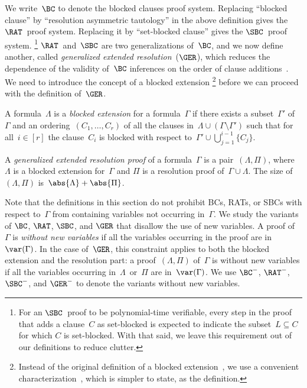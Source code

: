 \documentclass[10pt,a4paper]{article}
\begin{document}
We write~$\BC$ to denote the blocked clauses proof system.
Replacing ``blocked clause'' by ``resolution asymmetric tautology''
in the above definition gives the $\RAT$~proof system.
Replacing it by ``set-blocked clause'' gives the $\SBC$~proof system.%
\footnote{For an $\SBC$~proof to be polynomial-time verifiable,
  every step in the proof that adds a clause~$C$ as set-blocked
  is expected to indicate the subset~$L \subseteq C$ for which $C$ is set-blocked.
  With that said, we leave this requirement out of our definitions to reduce clutter.}
$\RAT$~and~$\SBC$ are two generalizations of~$\BC$, and we now define another,
called \emph{generalized extended resolution}~($\GER$),
which reduces the dependence of the validity of~$\BC$ inferences
on the order of clause additions~\cite[see][Section~1.3]{Kul99b}.
We need to introduce the concept of a blocked extension%
\footnote{Instead of the original definition
  of a blocked extension~\cite[Definition~6.3]{Kul99b},
  we use a convenient characterization~\cite[Lemma~6.5]{Kul99b},
  which is simpler to state, as the definition.}
before we can proceed with the definition of~$\GER$.

\begin{definition}\label{def:blocked-extension}
  A formula~$\Lambda$ is a \emph{blocked extension} for a formula~$\Gamma$
  if there exists a subset~$\Gamma'$ of~$\Gamma$
  and an ordering~$(C_1, \dots, C_r)$
  of all the clauses in~$\Lambda \cup (\Gamma \setminus \Gamma')$
  such that for all~$i \in [r]$ the clause~$C_i$ is blocked
  with respect to~$\Gamma' \cup \bigcup_{j = 1}^{i - 1} \{C_j\}$.
\end{definition}

\begin{definition}
  A \emph{generalized extended resolution proof} of a formula~$\Gamma$
  is a pair~$(\Lambda, \Pi)$,
  where $\Lambda$ is a blocked extension for~$\Gamma$
  and $\Pi$ is a resolution proof of~$\Gamma \cup \Lambda$.
  The size of~$(\Lambda, \Pi)$ is~$\abs{\Lambda} + \abs{\Pi}$.
\end{definition}

Note that the definitions in this section do not prohibit
BCs, RATs, or SBCs with respect to~$\Gamma$
from containing variables not occurring in~$\Gamma$.
We study the variants of $\BC$, $\RAT$, $\SBC$, and $\GER$
that disallow the use of new variables.
A proof of~$\Gamma$ is \emph{without new variables}
if all the variables occurring in the proof are in~$\var(\Gamma)$.
In the case of~$\GER$, this constraint applies to
both the blocked extension and the resolution part:
a proof~$(\Lambda, \Pi)$ of~$\Gamma$ is without new variables
if all the variables occurring in~$\Lambda$~or~$\Pi$ are in~$\var(\Gamma)$.
We use $\BC^-$, $\RAT^-$, $\SBC^-$, and $\GER^-$
to denote the variants without new variables.
\end{document}

